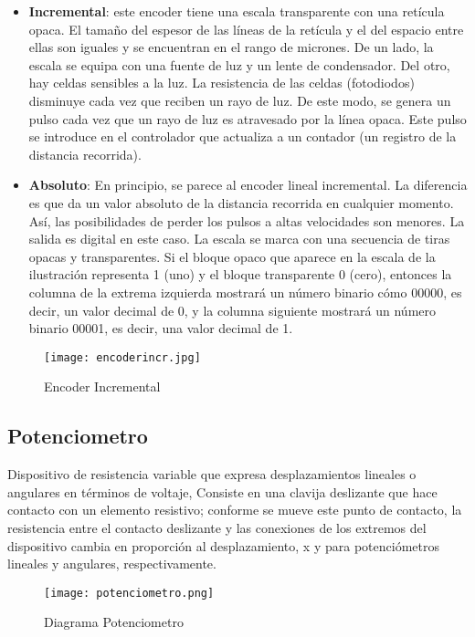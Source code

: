 \begin{itemize}

	\item \textbf{Incremental}: este encoder tiene una escala transparente con una retícula opaca. El tamaño del espesor de las líneas de la retícula y el del espacio entre ellas son iguales y se encuentran en el rango de micrones. De un lado, la escala se equipa con una fuente de luz y un lente de condensador. Del otro, hay celdas sensibles a la luz. La resistencia de las celdas (fotodiodos) disminuye cada vez que reciben un rayo de luz. De este modo, se genera un pulso cada vez que un rayo de luz es atravesado por la línea opaca. Este pulso se introduce en el controlador que actualiza a un contador (un registro de la distancia recorrida).
	
	\item \textbf{Absoluto}: En principio, se parece al encoder lineal incremental. La diferencia es que da un valor absoluto de la distancia recorrida en cualquier momento. Así, las posibilidades de perder los pulsos a altas velocidades son menores. La salida es digital en este caso. La escala se marca con una secuencia de tiras opacas y transparentes. Si el bloque opaco que aparece en la escala de la ilustración representa 1 (uno) y el bloque transparente 0 (cero), entonces la columna de la extrema izquierda mostrará un número binario cómo 00000, es decir, un valor decimal de 0, y la columna siguiente mostrará un número binario 00001, es decir, una valor decimal de 1.
\end{itemize}

\begin{figure}[h]
	\centering
	\texttt{[image: encoderincr.jpg]} %
	\caption{Encoder Incremental}
	\label{fig:ejemplo}
\end{figure}
\vspace{10cm}
\subsection*{\quad\textbf{Potenciometro}}
Dispositivo de resistencia variable que expresa desplazamientos lineales o angulares en términos de voltaje, Consiste en una clavija deslizante que hace contacto con un elemento resistivo; conforme se mueve este punto de contacto, la resistencia entre el contacto deslizante y las conexiones de los extremos del dispositivo cambia en proporción al desplazamiento, x y  para potenciómetros lineales y angulares, respectivamente.
\begin{figure}[h]
	\centering
	\texttt{[image: potenciometro.png]} %
	\caption{Diagrama Potenciometro}
	\label{fig:ejemplo2}
\end{figure}

